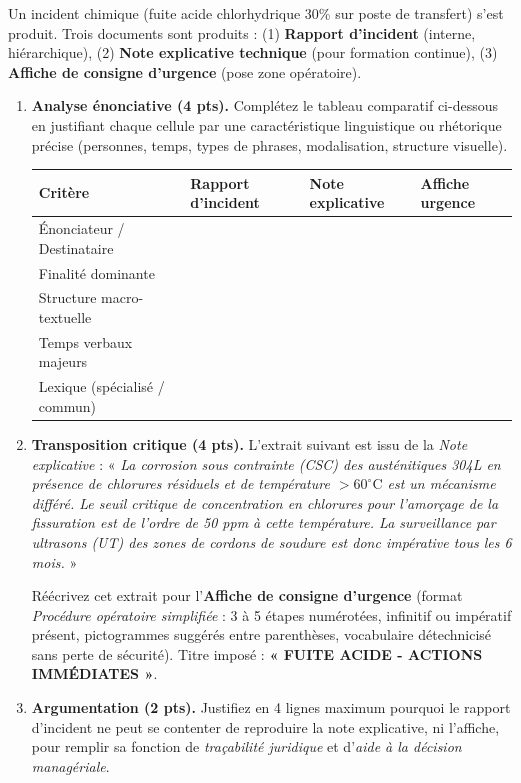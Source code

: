 \documentclass[11pt]{article}
\begin{document}
\begin{exercice}
\label{exo:inter}
Un incident chimique (fuite acide chlorhydrique  30\% sur poste de transfert) s'est produit. Trois documents sont produits : (1) \textbf{Rapport d'incident} (interne, hiérarchique), (2) \textbf{Note explicative technique} (pour formation continue), (3) \textbf{Affiche de consigne d'urgence} (pose zone opératoire).

\begin{enumerate}
    \item \textbf{Analyse énonciative (4 pts).} Complétez le tableau comparatif ci-dessous en justifiant chaque cellule par une caractéristique linguistique ou rhétorique précise (personnes, temps, types de phrases, modalisation, structure visuelle).

    \begin{tabularx}{\linewidth}{@{}lXXX@{}}
    \toprule
    \textbf{Critère} & \textbf{Rapport d'incident} & \textbf{Note explicative} & \textbf{Affiche urgence} \\
    \midrule
    Énonciateur / Destinataire &  &  &  \\
    Finalité dominante &  &  &  \\
    Structure macro-textuelle &  &  &  \\
    Temps verbaux majeurs &  &  &  \\
    Lexique (spécialisé / commun) &  &  &  \\
    \bottomrule
    \end{tabularx}

    \item \textbf{Transposition critique (4 pts).} L'extrait suivant est issu de la \textit{Note explicative} : « \textit{La corrosion sous contrainte (CSC) des austénitiques 304L en présence de chlorures résiduels et de température $>60^{\circ}\mathrm{C}$ est un mécanisme différé. Le seuil critique de concentration en chlorures pour l'amorçage de la fissuration est de l'ordre de 50 ppm à cette température. La surveillance par ultrasons (UT) des zones de cordons de soudure est donc impérative tous les 6 mois.} »

    Réécrivez cet extrait pour l'\textbf{Affiche de consigne d'urgence} (format \textit{Procédure opératoire simplifiée} : 3 à 5 étapes numérotées, infinitif ou impératif présent, pictogrammes suggérés entre parenthèses, vocabulaire détechnicisé sans perte de sécurité). Titre imposé : \textbf{« FUITE ACIDE - ACTIONS IMMÉDIATES »}.

    \item \textbf{Argumentation (2 pts).} Justifiez en 4 lignes maximum pourquoi le rapport d'incident ne peut se contenter de reproduire la note explicative, ni l'affiche, pour remplir sa fonction de \textit{traçabilité juridique} et d'\textit{aide à la décision managériale}.
\end{enumerate}
\end{exercice}
\end{document}
